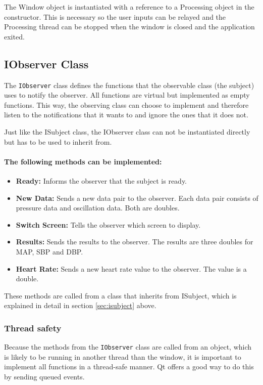 The Window object is instantiated with a reference to a Processing object in the constructor. This is necessary so the user inputs can be relayed and the Processing thread can be stopped when the window is closed and the application exited. 

\subsection{IObserver Class}\label{sec:iobserver}
The \texttt{IObserver} class defines the functions that the observable class (the subject) uses to notify the observer. All functions are virtual but implemented as empty functions. This way, the observing class can choose to implement and therefore listen to the notifications that it wants to and ignore the ones that it does not. 

Just like the ISubject class, the IObserver class can not be instantiated directly but has to be used to inherit from. 

\paragraph{The following methods can be implemented:}
\begin{itemize}[noitemsep]
\item \textbf{Ready:} Informs the observer that the subject is ready.
\item \textbf{New Data:} Sends a new data pair to the observer. Each data pair consists of pressure data and oscillation data. Both are doubles.
\item \textbf{Switch Screen:} Tells the observer which screen to display.
\item \textbf{Results:} Sends the results to the observer. The results are three doubles for MAP, SBP and DBP.
\item \textbf{Heart Rate:} Sends a new heart rate value to the observer. The value is a double.
\end{itemize}

These methods are called from a class that inherits from ISubject, which is explained in detail in section \ref{sec:isubject} above. 

\subsubsection{Thread safety}
Because the methods from the \texttt{IObserver} class are called from an object, which is likely to be running in another thread than the window, it is important to implement all functions in a thread-safe manner. Qt offers a good way to do this by sending queued events. 

